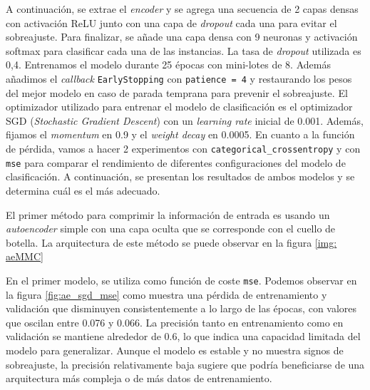A continuación, se extrae el \textit{encoder} y se agrega una secuencia de 2 capas densas con activación ReLU junto con una capa de \textit{dropout} cada una para evitar el sobreajuste. Para finalizar, se añade una capa densa con 9 neuronas y activación softmax para clasificar  cada una de las instancias. La tasa de \textit{dropout} utilizada es 0,4. Entrenamos el modelo durante 25 épocas con mini-lotes de 8. Además añadimos el \textit{callback} \lstinline|EarlyStopping| con \lstinline|patience = 4| y restaurando los pesos del mejor modelo en caso de parada temprana para prevenir el sobreajuste. El optimizador utilizado para entrenar el modelo de clasificación es el optimizador SGD (\textit{Stochastic Gradient Descent}) con un \textit{learning rate} inicial de 0.001. Además, fijamos el \textit{momentum} en 0.9 y el \textit{weight decay} en 0.0005. En cuanto a la función de pérdida, vamos a hacer 2 experimentos con \lstinline|categorical_crossentropy| y con \lstinline|mse| para comparar el rendimiento de diferentes configuraciones del modelo de clasificación. A continuación, se presentan los resultados de ambos modelos y se determina cuál es el más adecuado.
    
El primer método para comprimir la información de entrada es usando un \textit{autoencoder} simple con una capa oculta que se corresponde con el cuello de botella. La arquitectura de este método se puede observar en la figura \ref{img: aeMMC}

En el primer modelo, se utiliza como función de coste \lstinline|mse|. Podemos observar en la figura \ref{fig:ae_sgd_mse} como muestra una pérdida de entrenamiento y validación que disminuyen consistentemente a lo largo de las épocas, con valores que oscilan entre 0.076 y 0.066. La precisión tanto en entrenamiento como en validación se mantiene alrededor de 0.6, lo que indica una capacidad limitada del modelo para generalizar. Aunque el modelo es estable y no muestra signos de sobreajuste, la precisión relativamente baja sugiere que podría beneficiarse de una arquitectura más compleja o de más datos de entrenamiento.

